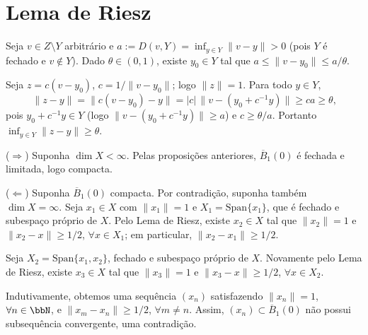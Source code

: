 

\section{Lema de Riesz}

\begin{myproof}
	Seja $v\in Z\setminus Y$ arbitrário e $a:=D(v,Y)=\inf_{y\in Y}\|v-y\|>0$ (pois $Y$ é fechado e
	$v\notin Y$). Dado $\theta\in(0,1)$, existe $y_0\in Y$ tal que $a\leq\|v-y_0\|\leq a/\theta$.

	Seja $z=c(v-y_0)$, $c=1/\|v-y_0\|$; logo $\|z\|=1$. Para todo $y\in Y$,
	$$\|z-y\|=\|c(v-y_0)-y\|=|c|\,\big\|v-(y_0+c^{-1}y)\big\|\geq ca\geq\theta\text{,}$$
	pois $y_0+c^{-1}y\in Y$ (logo $\|v-(y_0+c^{-1}y)\|\geq a$) e $c\geq\theta/a$. Portanto
	$\inf_{y\in Y}\|z-y\|\geq\theta$.
\end{myproof}


\begin{myproof}
	($\Rightarrow$) Suponha $\dim X<\infty$. Pelas proposições anteriores, $\overline{B}_1(0)$ é fechada e
	limitada, logo compacta.

	($\Leftarrow$) Suponha $\overline{B}_1(0)$ compacta. Por contradição, suponha também $\dim X=\infty$.
	Seja $x_1\in X$ com $\|x_1\|=1$ e $X_1=\text{Span}\{x_1\}$, que é fechado e subespaço próprio de $X$.
	Pelo Lema de Riesz, existe $x_2\in X$ tal que $\|x_2\|=1$ e $\|x_2-x\|\geq 1/2$, $\forall x\in X_1$; em
	particular, $\|x_2-x_1\|\geq 1/2$.

	Seja $X_2=\text{Span}\{x_1,x_2\}$, fechado e subespaço próprio de $X$. Novamente pelo Lema de Riesz,
	existe $x_3\in X$ tal que $\|x_3\|=1$ e $\|x_3-x\|\geq 1/2$, $\forall x\in X_2$.

	Indutivamente, obtemos uma sequência $(x_n)$ satisfazendo $\|x_n\|=1$, $\forall n\in\bbN$, e
	$\|x_m-x_n\|\geq 1/2$, $\forall m\neq n$. Assim, $(x_n)\subset \overline{B}_1(0)$ não possui
	subsequência convergente, uma contradição.
\end{myproof}

